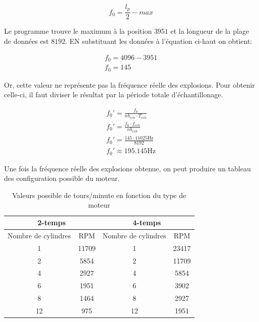 \documentclass[11pt]{article}
\begin{document}
\begin{equation}
  f_0 = \frac{l_p}{2} - {max}
\end{equation}

Le programme trouve le maximum à la position $3951$ et la longueur de la plage de données est $8192$. EN substituant les données à l'équation ci-haut on obtient:

\begin{gather*}
  f_0 = 4096 - 3951\\
  f_0 = 145
\end{gather*}

\pagebreak

Or, cette valeur ne représente pas la fréquence réelle des explosions. Pour obtenir celle-ci, il faut diviser le résultat par la période totale d'échantillonage. 

\begin{gather*}
  f_0' = \frac{f_0}{nb_{ech} \cdot T_{ech}}\\
  f_0' = \frac{f_0 \cdot f_{ech}}{nb_{ech}}\\
  f_0' = \frac{145 \cdot 11025\text{Hz}}{8192}\\
  f_0' \approx 195.145\text{Hz}
\end{gather*}

Une fois la fréquence réelle des explosions obtenue, on peut produire un tableau des configuration possible du moteur.

\begin{table}[!ht]
  \centering
  \caption{Valeurs possible de tours/minute en fonction du type de moteur}
  \begin{tabular}{*4c}
    \toprule
    \multicolumn{2}{c}{2-temps}  & \multicolumn{2}{c}{4-temps}\\
    \midrule\vspace{0.25cm}
    Nombre de cylindres  & RPM   & Nombre de cylindres & RPM\\
    1                    & 11709 & 1                   & 23417\\
    2                    & 5854  & 2                   & 11709\\
    4                    & 2927  & 4                   & 5854\\
    6                    & 1951  & 6                   & 3902\\
    8                    & 1464  & 8                   & 2927\\
    12                   & 975   & 12                  & 1951\\
    \bottomrule
  \end{tabular}
\end{table}
\end{document}

